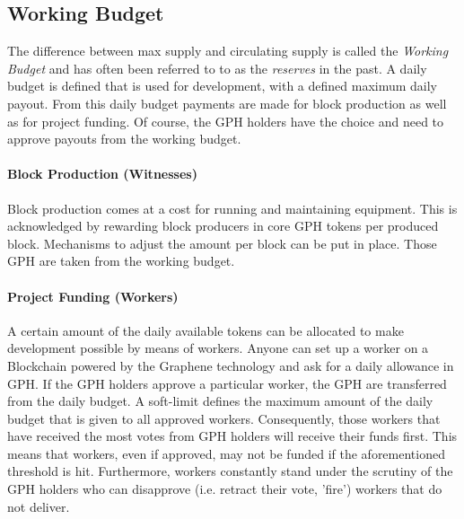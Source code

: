 \subsection{ Working Budget }
The difference between max supply and circulating supply is called the \emph{Working Budget} and has often been referred to to as the \emph{reserves} in the past.
A daily budget is defined that is used for development, with a defined maximum daily payout.
From this daily budget payments are made for block production as well as for project funding. Of course, the GPH holders have the choice and need to approve payouts from the working budget.

\paragraph{Block Production (Witnesses) }
Block production comes at a cost for running and maintaining equipment. This is acknowledged by rewarding block 
producers in core GPH tokens per produced block. Mechanisms to adjust the amount per block can be put in place. Those GPH are taken from the working budget.

\paragraph{Project Funding (Workers) }
A certain amount of the daily available tokens can be allocated to make development possible by means of workers. Anyone can set up a worker 
on a Blockchain powered by the Graphene technology and ask for a daily allowance in GPH. If the GPH holders approve a particular worker, the GPH are transferred from the 
daily budget. A soft-limit defines the maximum amount of the daily budget that is given to all approved workers. Consequently, those workers 
that have received the most votes from GPH holders will receive their funds first. This means that workers, even if approved, may not be funded if 
the aforementioned threshold is hit. Furthermore, workers constantly stand under the scrutiny of the GPH holders who can disapprove (i.e. retract their vote, 'fire') 
workers that do not deliver.